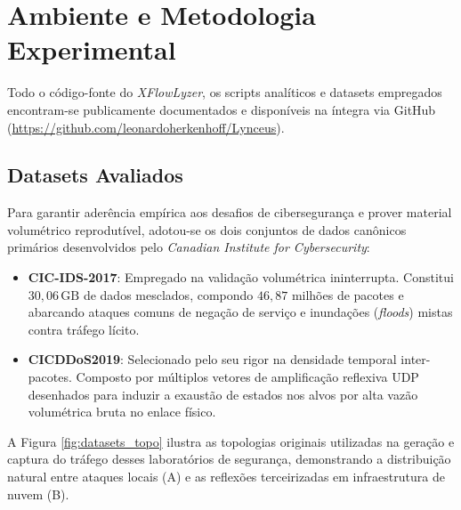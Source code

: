 \documentclass[conference]{IEEEtran}
\newcommand{\nome}{\textit{XFlowLyzer}\xspace}
\begin{document}
\section{Ambiente e Metodologia Experimental}
Todo o código-fonte do \nome, os scripts analíticos e datasets empregados encontram-se publicamente documentados e disponíveis na íntegra via GitHub (\url{https://github.com/leonardoherkenhoff/Lynceus}).



\subsection{Datasets Avaliados}

Para garantir aderência empírica aos desafios de cibersegurança e prover material volumétrico reprodutível, adotou-se os dois conjuntos de dados canônicos primários desenvolvidos pelo \textit{Canadian Institute for Cybersecurity}:
\begin{itemize}
    \item \textbf{CIC-IDS-2017}: Empregado na validação volumétrica ininterrupta. Constitui $30,06\,\text{GB}$ de dados mesclados, compondo $46,87$ milhões de pacotes e abarcando ataques comuns de negação de serviço e inundações (\textit{floods}) mistas contra tráfego lícito.
    \item \textbf{CICDDoS2019}: Selecionado pelo seu rigor na densidade temporal inter-pacotes. Composto por múltiplos vetores de amplificação reflexiva UDP desenhados para induzir a exaustão de estados nos alvos por alta vazão volumétrica bruta no enlace físico.
\end{itemize}

A Figura \ref{fig:datasets_topo} ilustra as topologias originais utilizadas na geração e captura do tráfego desses laboratórios de segurança, demonstrando a distribuição natural entre ataques locais (A) e as reflexões terceirizadas em infraestrutura de nuvem (B).
\end{document}
